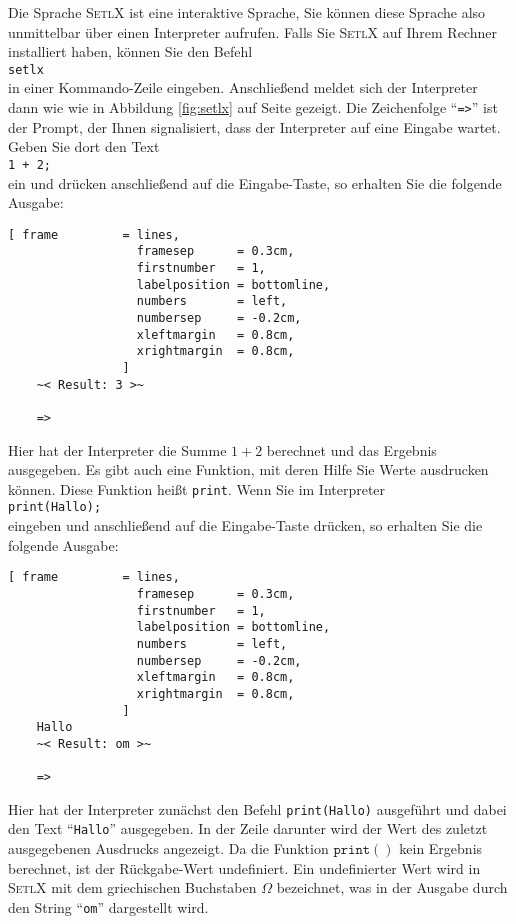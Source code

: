 Die Sprache \textsc{SetlX} ist eine interaktive Sprache, Sie können diese
Sprache also unmittelbar über einen Interpreter aufrufen.  Falls Sie \textsc{SetlX} auf
Ihrem Rechner installiert haben, können Sie den Befehl
\\[0.2cm]
\hspace*{1.3cm}
\texttt{setlx}
\\[0.2cm]
in einer Kommando-Zeile eingeben.  Anschließend meldet sich der Interpreter dann wie wie
in Abbildung \ref{fig:setlx} auf Seite \pageref{fig:setlx} gezeigt.  Die Zeichenfolge
``\texttt{=>}'' ist der Prompt, der Ihnen signalisiert, dass der Interpreter auf eine Eingabe
wartet.  Geben Sie dort den  Text
\\[0.2cm]
\hspace*{1.3cm}
\texttt{1 + 2;}
\\[0.2cm]
ein und drücken anschließend auf die Eingabe-Taste, so erhalten Sie
die folgende Ausgabe:

\begin{Verbatim}[ frame         = lines, 
                  framesep      = 0.3cm, 
                  firstnumber   = 1,
                  labelposition = bottomline,
                  numbers       = left,
                  numbersep     = -0.2cm,
                  xleftmargin   = 0.8cm,
                  xrightmargin  = 0.8cm,
                ]
    ~< Result: 3 >~
    
    => 
\end{Verbatim}
Hier hat der Interpreter die Summe $1+2$ berechnet und das Ergebnis ausgegeben.  Es gibt auch eine
Funktion, mit deren Hilfe Sie Werte ausdrucken können.  Diese Funktion heißt \texttt{print}.  Wenn
Sie im Interpreter
\\[0.2cm]
\hspace*{1.3cm}
\texttt{print(Hallo);}
\\[0.2cm]
eingeben und anschließend auf die Eingabe-Taste drücken, so erhalten Sie
die folgende Ausgabe:

\begin{Verbatim}[ frame         = lines, 
                  framesep      = 0.3cm, 
                  firstnumber   = 1,
                  labelposition = bottomline,
                  numbers       = left,
                  numbersep     = -0.2cm,
                  xleftmargin   = 0.8cm,
                  xrightmargin  = 0.8cm,
                ]
    Hallo
    ~< Result: om >~
    
    => 
\end{Verbatim}
Hier hat der Interpreter zunächst den Befehl \texttt{print(Hallo)} ausgeführt und dabei
den Text ``\texttt{Hallo}'' ausgegeben.  In der Zeile darunter wird der Wert des zuletzt
ausgegebenen Ausdrucks angezeigt.  Da die Funktion $\texttt{print}()$ kein Ergebnis
berechnet, ist der Rückgabe-Wert undefiniert.  Ein undefinierter Wert wird in
\textsc{SetlX} mit dem griechischen Buchstaben
\href{http://en.wikipedia.org/wiki/Greek_alphabet}{$\Omega$} bezeichnet, was in der Ausgabe durch
den String ``\texttt{om}'' dargestellt wird.

